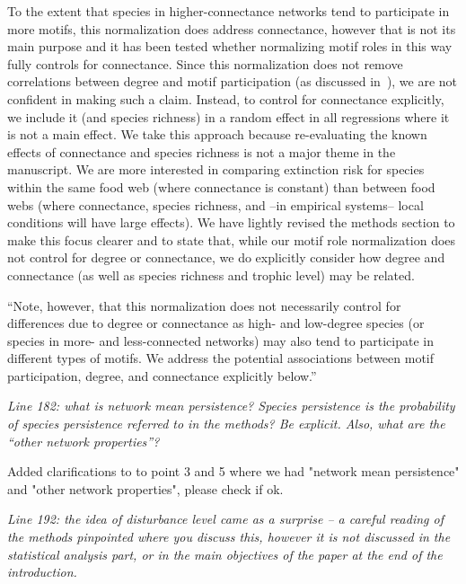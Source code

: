 \documentclass[12pt]{article}
\newcommand{\us}{\rm \setlength{\leftskip}{0.3cm} \setlength{\rightskip}{0.3cm}}
\newcommand{\them}{\it \setlength{\leftskip}{0cm} \setlength{\rightskip}{0cm}}
\begin{document}
        \us To the extent that species in higher-connectance networks tend to participate in more motifs, this normalization does address connectance, however that is not its main purpose and it has been tested whether normalizing motif roles in this way fully controls for connectance.
        Since this normalization does not remove correlations between degree and motif participation (as discussed in~\citealp[]{Cirtwill2021_inprep}), we are not confident in making such a claim.
        Instead, to control for connectance explicitly, we include it (and species richness) in a random effect in all regressions where it is not a main effect. 
        We take this approach because re-evaluating the known effects of connectance and species richness is not a major theme in the manuscript.
        We are more interested in comparing extinction risk for species within the same food web (where connectance is constant) than between food webs (where connectance, species richness, and --in empirical systems-- local conditions will have large effects).
        We have lightly revised the methods section to make this focus clearer and to state that, while our motif role normalization does not control for degree or connectance, we do explicitly consider how degree and connectance (as well as species richness and trophic level) may be related. 
        
        
        
            ``Note, however, that this normalization does not necessarily control for differences due to degree or connectance as high- and low-degree species (or species in more- and less-connected networks) may also tend to participate in different types of motifs.
            We address the potential associations between motif participation, degree, and connectance explicitly below.''
        
        
        \them
        Line 182: what is network mean persistence? Species persistence is the probability of species persistence referred to in the methods? Be explicit. Also, what are the “other network properties”?
        
        \us
        Added clarifications to to point 3 and 5 where we had "network mean persistence" and "other network properties", please check if ok. 
        
        \them
        Line 192: the idea of disturbance level came as a surprise – a careful reading of the methods pinpointed where you discuss this, however it is not discussed in the statistical analysis part, or in the main objectives of the paper at the end of the introduction.
        
\end{document}
